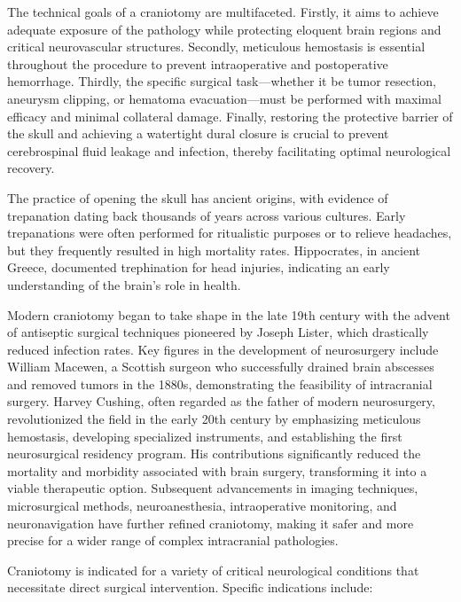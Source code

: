 The technical goals of a craniotomy are multifaceted. Firstly, it aims to achieve adequate exposure of the pathology while protecting eloquent brain regions and critical neurovascular structures. Secondly, meticulous hemostasis is essential throughout the procedure to prevent intraoperative and postoperative hemorrhage. Thirdly, the specific surgical task—whether it be tumor resection, aneurysm clipping, or hematoma evacuation—must be performed with maximal efficacy and minimal collateral damage. Finally, restoring the protective barrier of the skull and achieving a watertight dural closure is crucial to prevent cerebrospinal fluid leakage and infection, thereby facilitating optimal neurological recovery.

The practice of opening the skull has ancient origins, with evidence of trepanation dating back thousands of years across various cultures. Early trepanations were often performed for ritualistic purposes or to relieve headaches, but they frequently resulted in high mortality rates. Hippocrates, in ancient Greece, documented trephination for head injuries, indicating an early understanding of the brain's role in health.

Modern craniotomy began to take shape in the late 19th century with the advent of antiseptic surgical techniques pioneered by Joseph Lister, which drastically reduced infection rates. Key figures in the development of neurosurgery include William Macewen, a Scottish surgeon who successfully drained brain abscesses and removed tumors in the 1880s, demonstrating the feasibility of intracranial surgery. Harvey Cushing, often regarded as the father of modern neurosurgery, revolutionized the field in the early 20th century by emphasizing meticulous hemostasis, developing specialized instruments, and establishing the first neurosurgical residency program. His contributions significantly reduced the mortality and morbidity associated with brain surgery, transforming it into a viable therapeutic option. Subsequent advancements in imaging techniques, microsurgical methods, neuroanesthesia, intraoperative monitoring, and neuronavigation have further refined craniotomy, making it safer and more precise for a wider range of complex intracranial pathologies.

Craniotomy is indicated for a variety of critical neurological conditions that necessitate direct surgical intervention. Specific indications include:

